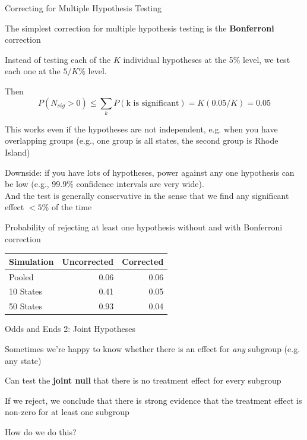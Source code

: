 \documentclass[11pt,english,handout]{beamer}
\newenvironment{wideitemize}{\itemize\addtolength{\itemsep}{10pt}}{\enditemize}
\begin{document}
\begin{frame}{Correcting for Multiple Hypothesis Testing}
\begin{wideitemize}
	\item
	The simplest correction for multiple hypothesis testing is the \textbf{Bonferroni} correction
	
	\pause
	\item
	Instead of testing each of the $K$ individual hypotheses at the 5\% level, we test each one at the $5/K$\% level.
	
	\pause
	\item
	Then 
	$$P( N_{sig} > 0  ) \leq \sum_k P( \text{k is significant}  ) = K (0.05/K) = 0.05 $$
	
	\pause
	\item
	This works even if the hypotheses are not independent, e.g. when you have overlapping groups (e.g., one group is all states, the second group is Rhode Island)
	
	\pause
	\item
	Downside: if you have lots of hypotheses, power against any one hypothesis can be low (e.g., 99.9\% confidence intervals are very wide).\\ \pause{}
	And the test is generally conservative in the sense that we find any significant effect $<5$\% of the time
		
\end{wideitemize}	
\end{frame}


\begin{frame}
	Probability of rejecting at least one hypothesis without and with Bonferroni correction \\
	\begin{tabular}{lrr}
		Simulation & Uncorrected & Corrected \\ \hline
		Pooled & 0.06 & 0.06 \\
		10 States & 0.41 &  0.05 \\
		50 States & 0.93 & 0.04
	\end{tabular}
\end{frame}


\begin{frame}{Odds and Ends 2: Joint Hypotheses}
	\begin{wideitemize}
		\item
		Sometimes we're happy to know whether there is an effect for \textit{any} subgroup (e.g. any state)
		
		\pause
		\item
		Can test the \textbf{joint null} that there is no treatment effect for every subgroup
		
		\pause
		\item
		If we reject, we conclude that there is strong evidence that the treatment effect is non-zero for at least one subgroup
		
		\pause
		\item
		How do we do this? 
		
	\end{wideitemize}	
\end{frame}
\end{document}
